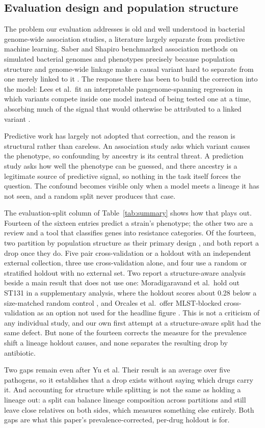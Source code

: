 \subsection*{Evaluation design and population structure}
The problem our evaluation addresses is old and well understood in bacterial genome-wide
association studies, a literature largely separate from predictive machine learning. Saber and
Shapiro benchmarked association methods on simulated bacterial genomes and phenotypes precisely
because population structure and genome-wide linkage make a causal variant hard to separate from
one merely linked to it \cite{saber2020bacgwas}. The response there has been to build the
correction into the model: Lees et al.\ fit an interpretable pangenome-spanning regression in which
variants compete inside one model instead of being tested one at a time, absorbing much of the
signal that would otherwise be attributed to a linked variant \cite{lees2020pyseer}.

Predictive work has largely not adopted that correction, and the reason is structural rather than
careless. An association study asks which variant causes the phenotype, so confounding by ancestry
is its central threat. A prediction study asks how well the phenotype can be guessed, and there
ancestry is a legitimate source of predictive signal, so nothing in the task itself forces the
question. The confound becomes visible only when a model meets a lineage it has not seen, and a
random split never produces that case.

The evaluation-split column of Table~\ref{tab:summary} shows how that plays out. Fourteen of the
sixteen entries predict a strain's phenotype; the other two are a review and a tool that classifies
genes into resistance categories. Of the fourteen, two partition by population structure as their
primary design \cite{yu2025biased,hu2024assessing}, and both report a drop once they do. Five pair
cross-validation or a holdout with an independent external collection, three use cross-validation
alone, and four use a random or stratified holdout with no external set. Two report a
structure-aware analysis beside a main result that does not use one: Moradigaravand et al.\ hold out
ST131 in a supplementary analysis, where the holdout scores about 0.28 below a size-matched random
control \cite{moradigaravand2018prediction}, and Orcales et al.\ offer MLST-blocked
cross-validation as an option not used for the headline figure \cite{orcales2024tutorial}. This is
not a criticism of any individual study, and our own first attempt at a structure-aware split had
the same defect. But none of the fourteen corrects the measure for the prevalence shift a lineage
holdout causes, and none separates the resulting drop by antibiotic.

Two gaps remain even after Yu et al. Their result is an average over five pathogens, so it
establishes that a drop exists without saying which drugs carry it. And accounting for structure
while splitting is not the same as holding a lineage out: a split can balance lineage composition
across partitions and still leave close relatives on both sides, which measures something else
entirely. Both gaps are what this paper's prevalence-corrected, per-drug holdout is for.
